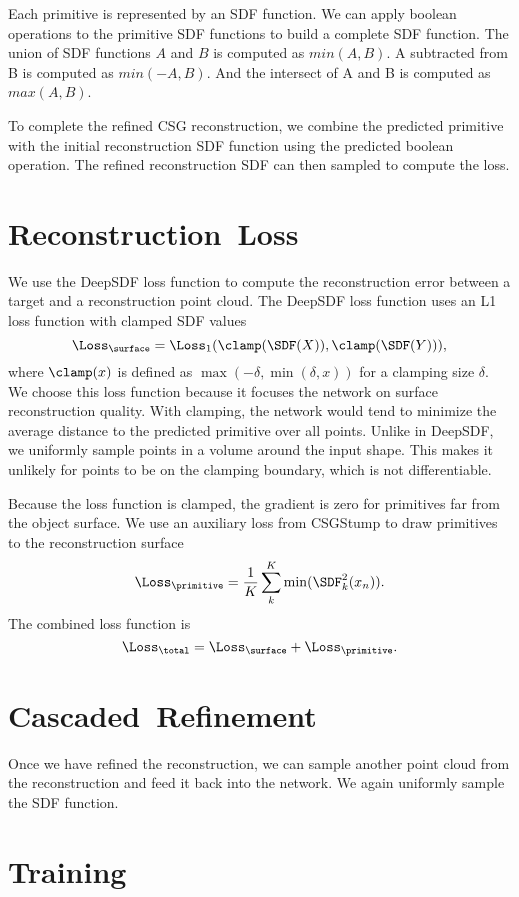 Each primitive is represented by an SDF function. We can apply boolean operations to the primitive SDF functions to build a complete SDF function. The union of SDF functions $A$ and $B$ is computed as $min(A, B)$. A subtracted from B is computed as $min(-A, B)$. And the intersect of A and B is computed as $max(A, B)$.

To complete the refined CSG reconstruction, we combine the predicted primitive with the initial reconstruction SDF function using the predicted boolean operation. The refined reconstruction SDF can then sampled to compute the loss.


\section{Reconstruction~Loss}
\label{sec:reconstruction_loss}

We use the DeepSDF loss function to compute the reconstruction error between a target and a reconstruction point cloud. The DeepSDF loss function uses an L1 loss function with clamped SDF values
\[\Loss_{\surface}=\Loss_1(\clamp(\SDF(X)), \clamp(\SDF(Y))),\]
where $\clamp(x)$ is defined as $\max(-\delta, \min(\delta, x))$ for a clamping size $\delta$. We choose this loss function because it focuses the network on surface reconstruction quality. With clamping, the network would tend to minimize the average distance to the predicted primitive over all points. Unlike in DeepSDF, we uniformly sample points in a volume around the input shape. This makes it unlikely for points to be on the clamping boundary, which is not differentiable.

Because the loss function is clamped, the gradient is zero for primitives far from the object surface. We use an auxiliary loss from CSGStump to draw primitives to the reconstruction surface
\[\Loss_{\primitive} = \frac{1}{K} \sum_{k}^{K} \min ( \SDF_k^2(x_n) ).\]
The combined loss function is
\[\Loss_{\total} = \Loss_{\surface} + \Loss_{\primitive}.\]


\section{Cascaded~Refinement}
\label{sec:cascaded_refinement}

Once we have refined the reconstruction, we can sample another point cloud from the reconstruction and feed it back into the network. We again uniformly sample the SDF function.


\section{Training}
\label{sec:training}


